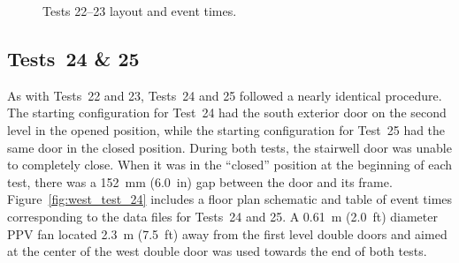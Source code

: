 \begin{figure}[!ht]
\begin{minipage}[b]{\columnwidth}
\end{minipage}
\renewcommand{\baselinestretch}{1}
\caption{Tests 22--23 layout and event times.}
\label{fig:west_test_22}
\end{figure}
\FloatBarrier

\subsection{Tests~24 \& 25}

As with Tests~22 and 23, Tests~24 and 25 followed a nearly identical procedure. The starting configuration for Test~24 had the south exterior door on the second level in the opened position, while the starting configuration for Test~25 had the same door in the closed position. During both tests, the stairwell door was unable to completely close. When it was in the ``closed'' position at the beginning of each test, there was a 152~mm (6.0~in) gap between the door and its frame. Figure~\ref{fig:west_test_24} includes a floor plan schematic and table of event times corresponding to the data files for Tests~24 and 25. A 0.61~m (2.0~ft) diameter PPV fan located 2.3~m (7.5~ft) away from the first level double doors and aimed at the center of the west double door was used towards the end of both tests.

